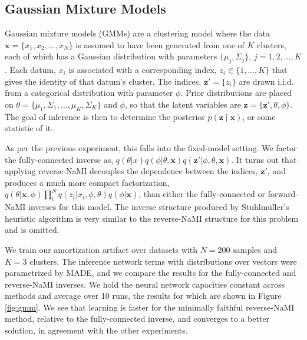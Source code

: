 \subsection{Gaussian Mixture Models}\label{sec:gmm-experiment}

Gaussian mixture models (GMMs) are a clustering model where the data
$\mathbf{x}=\{x_1,x_2,\ldots,x_N\}$ is
assumed to have been generated from one of $K$ clusters, each of which
has a Gaussian distribution with parameters $\{\mu_j,\Sigma_j\}$, $j=1,2,\ldots,K$.   Each datum, $x_i$ is associated with a corresponding index, $z_i\in\{1,\ldots,K\}$ that gives the identity of that datum's cluster. The indices, $\mathbf{z}'=\{z_i\}$ are drawn i.i.d. from a categorical distribution with parameter $\phi$. Prior distributions are placed on $\theta=\{\mu_1,\Sigma_1,\ldots,\mu_K,\Sigma_K\}$ and $\phi$, so that the latent variables are $\mathbf{z}=\{\mathbf{z}',\theta,\phi\}$. The goal of inference is then to determine the posterior $p(\mathbf{z}\mid\mathbf{x})$, or some statistic of it.

As per the previous experiment, this falls into the fixed-model setting.
We factor the fully-connected inverse as, $q(\theta|x)q(\phi|\theta,\mathbf{x})q(\mathbf{z}'|\phi,\theta,\mathbf{x})$.
It turns out that applying reverse-NaMI decouples the dependence between the indices, $\mathbf{z}'$, and produces a much more compact factorization, $q(\theta|\mathbf{x},\phi)\prod^N_iq(z_i|x_i,\phi,\theta)q(\phi|\mathbf{x})$, than either the fully-connected or forward-NaMI inverses for this model. The inverse structure produced by Stuhlm\"uller's heuristic algorithm is very similar to the reverse-NaMI structure for this problem and is omitted.

We train our amortization artifact over datasets with $N=200$ samples and $K=3$ clusters. The inference network terms with distributions over vectors were parametrized by MADE, and we compare the results for the fully-connected and reverse-NaMI inverses.  We hold the neural network capacities constant across methods and average over 10 runs, the results for which are shown in Figure \ref{fig:gmm}. We see that learning is faster for the minimally faithful reverse-NaMI method, relative to the fully-connected inverse, and converges to a better solution, in agreement with the other experiments.

